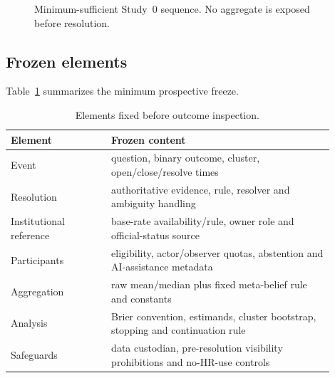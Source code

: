 \begin{figure}[ht]
\centering
{}
\caption{Minimum-sufficient Study~0 sequence. No aggregate is exposed before resolution.}
\end{figure}

\subsection{Frozen elements}
Table~\ref{tab:freeze} summarizes the minimum prospective freeze.

\begin{table}[ht]
\centering
\small
\begin{tabular}{p{0.28\linewidth}p{0.62\linewidth}}
\toprule
Element & Frozen content \\
\midrule
Event & question, binary outcome, cluster, open/close/resolve times \\
Resolution & authoritative evidence, rule, resolver and ambiguity handling \\
Institutional reference & base-rate availability/rule, owner role and official-status source \\
Participants & eligibility, actor/observer quotas, abstention and AI-assistance metadata \\
Aggregation & raw mean/median plus fixed meta-belief rule and constants \\
Analysis & Brier convention, estimands, cluster bootstrap, stopping and continuation rule \\
Safeguards & data custodian, pre-resolution visibility prohibitions and no-HR-use controls \\
\bottomrule
\end{tabular}
\caption{Elements fixed before outcome inspection.}
\label{tab:freeze}
\end{table}

